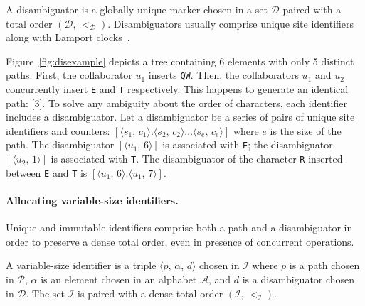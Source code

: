 \begin{definition}[Disambiguator]
  A disambiguator is a globally unique marker chosen in a set $\mathcal{D}$
  paired with a total order $(\mathcal{D},\, <_\mathcal{D})$. Disambiguators
  usually comprise unique site identifiers along with Lamport
  clocks~\cite{lamport1978time}.
\end{definition}

Figure~\ref{fig:disexample} depicts a tree containing 6 elements with only 5
distinct paths. First, the collaborator $u_1$ inserts \texttt{QW}.  Then, the
collaborators $u_1$ and $u_2$ concurrently insert \texttt{E} and \texttt{T}
respectively. This happens to generate an identical path: [$3$]. To solve any
ambiguity about the order of characters, each identifier includes a
disambiguator.  Let a disambiguator be a series of pairs of unique site
identifiers and counters:
$[\langle s_1,\, c_1 \rangle.\langle s_2,\, c_2 \rangle \ldots \langle s_e,\,
c_e \rangle]$
where $e$ is the size of the path.  The disambiguator
$[\langle u_1,\, 6\rangle]$ is associated with \texttt{E}; the disambiguator
$[\langle u_2,\, 1\rangle]$ is associated with \texttt{T}. The disambiguator of
the character \texttt{R} inserted between \texttt{E} and \texttt{T} is
$[\langle u_1,\, 6\rangle.\langle u_1,\, 7\rangle]$.

\paragraph{Allocating variable-size identifiers.}
Unique and immutable identifiers comprise both a path and a disambiguator in
order to preserve a dense total order, even in presence of concurrent
operations.

\begin{definition}
  A variable-size identifier is a triple $\langle p,\, \alpha,\, d \rangle$
  chosen in $\mathcal{I}$ where $p$ is a path chosen in $\mathcal{P}$, $\alpha$
  is an element chosen in an alphabet $\mathcal{A}$, and $d$ is a disambiguator
  chosen in $\mathcal{D}$. The set $\mathcal{I}$ is paired with a dense total
  order $(\mathcal{I},\,<_\mathcal{I})$.
\end{definition}

